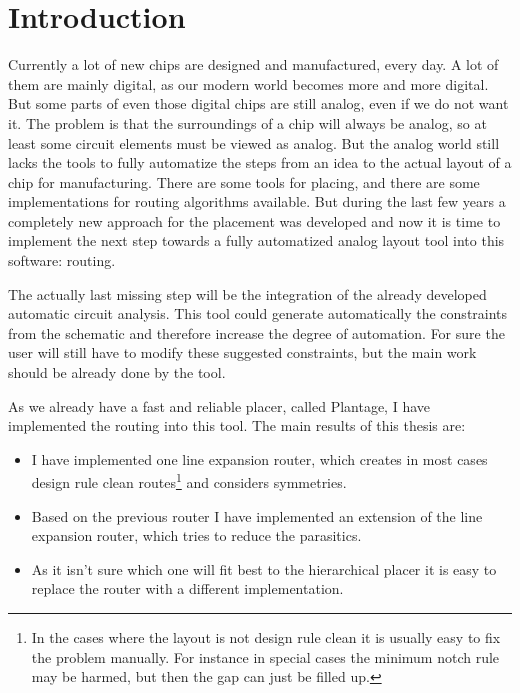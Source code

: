 \chapter{Introduction}

Currently a lot of new chips are designed and manufactured, every day. A lot of them are mainly digital, as our modern world becomes more and more digital. But some parts of even those digital chips are still analog, even if we do not want it. The problem is that the surroundings of a chip will always be analog, so at least some circuit elements must be viewed as analog. But the analog world still lacks the tools to fully automatize the steps from an idea to the actual layout of a chip for manufacturing. There are some tools for placing, and there are some implementations for routing algorithms available. But during the last few years a completely new approach for the placement was developed and now it is time to implement the next step towards a fully automatized analog layout tool into this software: routing.

The actually last missing step will be the integration of the already developed automatic circuit analysis. This tool could generate automatically the constraints from the schematic and therefore increase the degree of automation. For sure the user will still have to modify these suggested constraints, but the main work should be already done by the tool.

As we already have a fast and reliable placer, called Plantage, I have implemented the routing into this tool. The main results of this thesis are:
\begin{itemize}
\item I have implemented one line expansion router, which creates in most cases design rule clean routes\footnote{\label{foot:1}In the cases where the layout is not design rule clean it is usually easy to fix the problem manually. For instance in special cases the minimum notch rule may be harmed, but then the gap can just be filled up.} and considers symmetries.
\item Based on the previous router I have implemented an extension of the line expansion router, which tries to reduce the parasitics.
\item As it isn't sure which one will fit best to the hierarchical placer it is easy to replace the router with a different implementation.
\end{itemize}